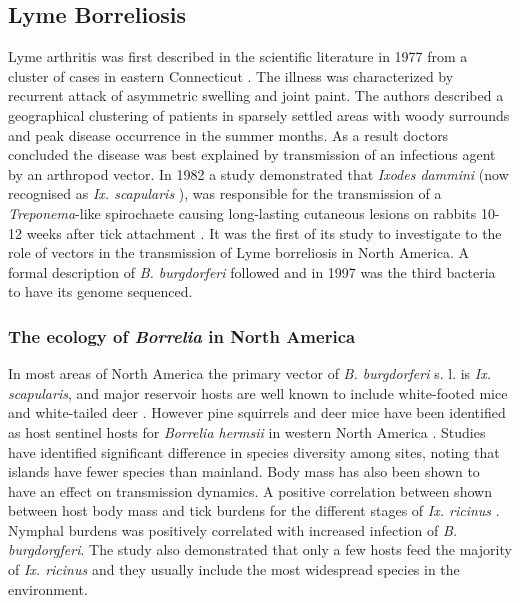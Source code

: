 \documentclass[a4paper, nobind]{templates/ociamthesis}
\begin{document}
\hypertarget{lyme-borreliosis}{%
\subsection{Lyme Borreliosis}\label{lyme-borreliosis}}

Lyme arthritis was first described in the scientific literature in 1977 from a cluster of cases in eastern Connecticut \autocite{steereLymeArthritisEpidemic1977}.
The illness was characterized by recurrent attack of asymmetric swelling and joint paint.
The authors described a geographical clustering of patients in sparsely settled areas with woody surrounds and peak disease occurrence in the summer months.
As a result doctors concluded the disease was best explained by transmission of an infectious agent by an arthropod vector.
In 1982 a study demonstrated that \emph{Ixodes dammini} (now recognised as \emph{Ix. scapularis} \autocite{sandersIxodesDamminiJunior1998}), was responsible for the transmission of a \emph{Treponema}-like spirochaete causing long-lasting cutaneous lesions on rabbits 10-12 weeks after tick attachment \autocite{burgdorferLymeDiseaseTickborne1982}.
It was the first of its study to investigate to the role of vectors in the transmission of Lyme borreliosis in North America.
A formal description of \emph{B. burgdorferi} followed \autocite{johnsonBorreliaBurgdorferiSp1984} and in 1997 \autocite{fraserGenomicSequenceLyme1997} was the third bacteria to have its genome sequenced.

\hypertarget{the-ecology-of-borrelia-in-north-america}{%
\subsubsection{\texorpdfstring{The ecology of \emph{Borrelia} in North America}{The ecology of Borrelia in North America}}\label{the-ecology-of-borrelia-in-north-america}}

In most areas of North America the primary vector of \emph{B. burgdorferi} s. l. is \emph{Ix. scapularis}, and major reservoir hosts are well known to include white-footed mice and white-tailed deer \autocite{halseyRoleIxodesScapularis2018}.
However pine squirrels and deer mice have been identified as host sentinel hosts for \emph{Borrelia hermsii} in western North America \autocite{cadenasIdentificationHostBloodmeal2007}.
Studies have identified significant difference in species diversity among sites, noting that islands have fewer species than mainland.
Body mass has also been shown to have an effect on transmission dynamics.
A positive correlation between shown between host body mass and tick burdens for the different stages of \emph{Ix. ricinus} \autocite{hofmeesterFewVertebrateSpecies2016}.
Nymphal burdens was positively correlated with increased infection of \emph{B. burgdorgferi}.
The study also demonstrated that only a few hosts feed the majority of \emph{Ix. ricinus} and they usually include the most widespread species in the environment.
\end{document}
